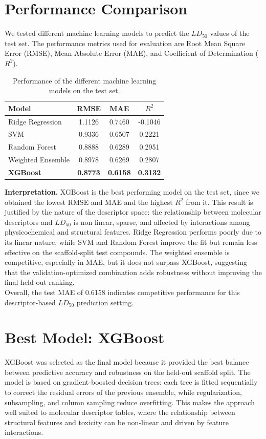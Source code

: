 \documentclass[10pt,a4paper,twocolumn]{article}
\begin{document}
\section{Performance Comparison}
We tested different machine learning models to predict the $LD_{50}$ values of the test set. 
The performance metrics used for evaluation are Root Mean Square Error (RMSE), 
Mean Absolute Error (MAE), and Coefficient of Determination ($R^2$).

\begin{table}[H]
\centering
\caption{Performance of the different machine learning models on the test set.}
\label{tab:model_test_comparison}
\footnotesize
\begin{tabular}{@{}lccc@{}}
\toprule
Model & RMSE & MAE & $R^2$ \\
\midrule
Ridge Regression & 1.1126 & 0.7460 & -0.1046 \\
SVM & 0.9336 & 0.6507 & 0.2221 \\
Random Forest & 0.8888 & 0.6289 & 0.2951 \\
Weighted Ensemble & 0.8978 & 0.6269 & 0.2807 \\
\textbf{XGBoost} & \textbf{0.8773} & \textbf{0.6158} & \textbf{0.3132} \\
\bottomrule
\end{tabular}

\vspace{0.6em}
\raggedright
\textbf{Interpretation.}
XGBoost is the best performing model on the test set, since we obtained the 
lowest RMSE and MAE and the highest $R^2$ from it. This result is justified 
by the nature of the descriptor space: the relationship between molecular 
descriptors and $LD_{50}$ is non linear, sparse, and affected by interactions 
among physicochemical and structural features. Ridge Regression performs poorly
due to its linear nature, while SVM and Random Forest improve the 
fit but remain less effective on the scaffold-split test compounds. 
The weighted ensemble is competitive, especially in MAE, but it does not surpass 
XGBoost, suggesting that the validation-optimized combination adds robustness 
without improving the final held-out ranking.
\\
Overall, the test MAE of 0.6158 indicates competitive performance for this
descriptor-based $LD_{50}$ prediction setting.
\end{table}

\section{Best Model: XGBoost}
XGBoost was selected as the final model because it provided the best balance
between predictive accuracy and robustness on the held-out scaffold split. The
model is based on gradient-boosted decision trees: each tree is fitted
sequentially to correct the residual errors of the previous ensemble, while
regularization, subsampling, and column sampling reduce overfitting. This makes
the approach well suited to molecular descriptor tables, where the relationship
between structural features and toxicity can be non-linear and driven by
feature interactions.
\end{document}

